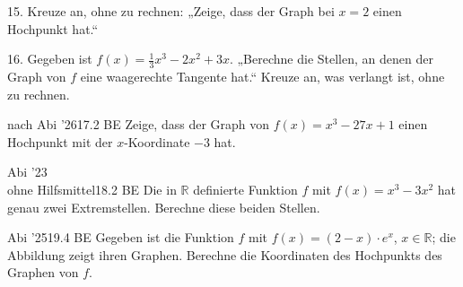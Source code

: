 \documentclass[11pt]{article}
\begin{document}
\begin{pfaufg}{}{15.}{}
Kreuze an, ohne zu rechnen: „Zeige, dass der Graph bei $x = 2$ einen Hochpunkt hat.“ 
\end{pfaufg}
\begin{pfaufg}{}{16.}{}
Gegeben ist $f(x) = \tfrac{1}{3}x^3 - 2x^2 + 3x$. „Berechne die Stellen, an denen der Graph von $f$ eine waagerechte Tangente hat.“ Kreuze an, was verlangt ist, ohne zu rechnen. 
\end{pfaufg}
\pfgruppe{}
\begin{pfaufg}{nach Abi ’26}{17.}{2 BE}
Zeige, dass der Graph von $f(x) = x^3 - 27x + 1$ einen Hochpunkt mit der $x$-Koordinate $-3$ hat.
\end{pfaufg}
\pfgruppe{}
\begin{pfaufg}{Abi ’23\\ohne Hilfsmittel}{18.}{2 BE}
Die in $\mathbb{R}$ definierte Funktion $f$ mit $f(x) = x^3 - 3x^2$ hat genau zwei Extremstellen. Berechne diese beiden Stellen.
\end{pfaufg}
\begin{pfaufg}{Abi ’25}{19.}{4 BE}
Gegeben ist die Funktion $f$ mit $f(x) = (2 - x)\cdot e^x$, $x \in \mathbb{R}$; die Abbildung zeigt ihren Graphen. Berechne die Koordinaten des Hochpunkts des Graphen von $f$.
\par\smallskip\noindent {}\par
{}
\end{pfaufg}
\end{document}
